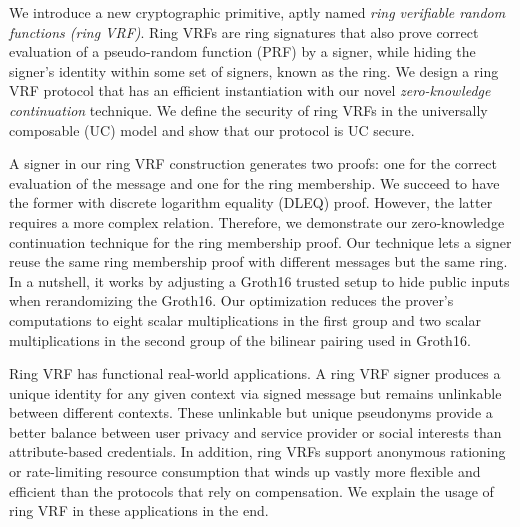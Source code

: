 
\def\eprintsmallskip{\smallskip}{}%
We introduce a new cryptographic primitive, aptly named
\emph{ring verifiable random functions (ring VRF)}.
Ring VRFs are ring signatures that also prove correct evaluation
of a pseudo-random function (PRF) by a signer, while hiding the  signer's
identity within some set of signers, known as the ring. 
We design a ring VRF protocol that has an efficient instantiation with our novel {\em zero-knowledge continuation} technique.
We define the security of ring VRFs in the universally composable (UC) model and show that our protocol is UC secure.

\eprintsmallskip
A signer in our ring VRF construction generates two proofs: one for the correct evaluation of the message and one for the ring membership. We succeed to have the former with discrete logarithm equality (DLEQ) proof. However, the latter requires a more complex relation. Therefore,  we demonstrate our zero-knowledge continuation technique for the ring membership proof.  Our technique lets a signer reuse the same ring membership proof with different messages but the same ring. 
In a nutshell, it works by adjusting a Groth16 trusted setup to hide public inputs when rerandomizing the Groth16.  
Our optimization reduces the prover's computations to eight scalar multiplications in the first group and two scalar multiplications in the second group of the bilinear pairing used in Groth16.

\eprintsmallskip
Ring VRF has functional real-world applications.
A ring VRF signer produces a unique identity for any given context via signed message but remains
unlinkable between different contexts.  These unlinkable but unique
pseudonyms provide a better balance between user privacy and service provider or social interests than attribute-based credentials.
In addition,
ring VRFs support anonymous rationing or rate-limiting resource
consumption that winds up vastly more flexible and efficient than the protocols that rely on compensation.
We explain the usage of ring VRF in these applications in the end.
